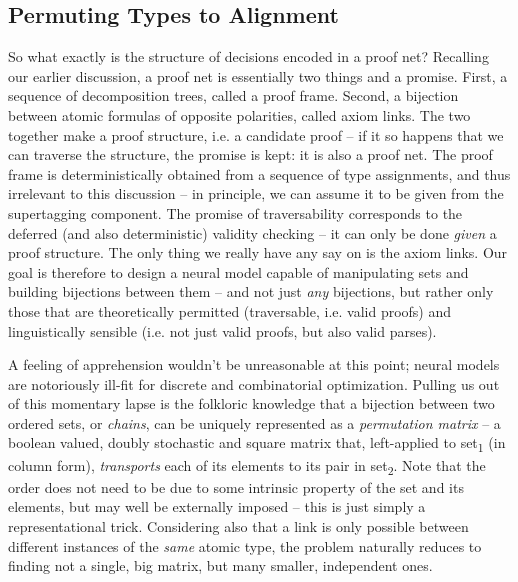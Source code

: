 \subsection{Permuting Types to Alignment}
So what exactly is the structure of decisions encoded in a proof net?
Recalling our earlier discussion, a proof net is essentially two things and a promise.
First, a sequence of decomposition trees, called a proof frame.
Second, a bijection between atomic formulas of opposite polarities, called axiom links.
The two together make a proof structure, i.e. a candidate proof -- if it so happens that we can traverse the structure, the promise is kept: it is also a proof net.
The proof frame is deterministically obtained from a sequence of type assignments, and thus irrelevant to this discussion -- in principle, we can assume it to be given from the supertagging component.
The promise of traversability corresponds to the deferred (and also deterministic) validity checking -- it can only be done \textit{given} a proof structure.
The only thing we really have any say on is the axiom links.
Our goal is therefore to design a neural model capable of manipulating sets and building bijections between them -- and not just \textit{any} bijections, but rather only those that are theoretically permitted (traversable, i.e. valid proofs) and linguistically sensible (i.e. not just valid proofs, but also valid parses).

A feeling of apprehension wouldn't be unreasonable at this point; neural models are notoriously ill-fit for discrete and combinatorial optimization.
Pulling us out of this momentary lapse is the folkloric knowledge that a bijection between two ordered sets, or \textit{chains}, can be uniquely represented as a \textit{permutation matrix} -- a boolean valued, doubly stochastic and square matrix that, left-applied to set\textsubscript{1} (in column form), \textit{transports} each of its elements to its pair in set\textsubscript{2}.
Note that the order does not need to be due to some intrinsic property of the set and its elements, but may well be externally imposed -- this is just simply a representational trick.
Considering also that a link is only possible between different instances of the \textit{same} atomic type, the problem naturally reduces to finding not a single, big matrix, but many smaller, independent ones.

